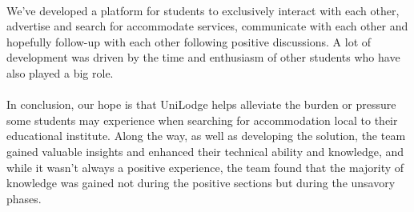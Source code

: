 \paragraph{}
We've developed a platform for students to exclusively interact with each other, advertise and search for accommodate services, communicate with each other and hopefully follow-up with each other following positive discussions. A lot of development was driven by the time and enthusiasm of other students who have also played a big role.

\paragraph{}
In conclusion, our hope is that UniLodge helps alleviate the burden or pressure some students may experience when searching for accommodation local to their educational institute. Along the way, as well as developing the solution, the team gained valuable insights and enhanced their technical ability and knowledge, and while it wasn't always a positive experience, the team found that the majority of knowledge was gained not during the positive sections but during the unsavory phases.
